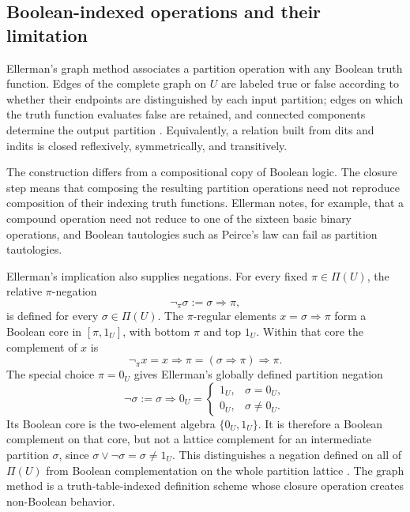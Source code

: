 \documentclass[aps,pra,reprint,nofootinbib]{revtex4-2}
\newcommand{\Part}{\Pi}
\begin{document}
\subsection{Boolean-indexed operations and their limitation}

Ellerman's graph method associates a partition operation with any Boolean
truth function.  Edges of the complete graph on $U$ are labeled true or false
according to whether their endpoints are distinguished by each input
partition; edges on which the truth function evaluates false are retained,
and connected components determine the output partition
\cite{ellerman-2019-graph-partitions}.  Equivalently, a relation built from dits and indits is
closed reflexively, symmetrically, and transitively.

The construction differs from a compositional copy of Boolean logic.  The
closure step means that composing the resulting
partition operations need not reproduce composition of their indexing truth
functions.  Ellerman notes, for example, that a compound operation need not
reduce to one of the sixteen basic binary operations, and Boolean tautologies
such as Peirce's law can fail as partition tautologies.

Ellerman's implication also supplies negations.  For every fixed
$\pi\in\Part(U)$, the relative $\pi$-negation
\begin{equation}
  \neg_{\pi}\sigma:=\sigma\Rightarrow\pi,
  \label{eq:relative-negation}
\end{equation}
is defined for every $\sigma\in\Part(U)$.  The $\pi$-regular elements
$x=\sigma\Rightarrow\pi$ form a Boolean core in $[\pi,1_U]$, with bottom
$\pi$ and top $1_U$.
Within that core the complement of $x$ is
\begin{equation}
  \neg_{\pi}x=x\Rightarrow\pi
  =(\sigma\Rightarrow\pi)\Rightarrow\pi.
  \label{eq:boolean-core-complement}
\end{equation}
The special choice $\pi=0_U$ gives Ellerman's globally defined partition
negation
\begin{equation}
  \neg\sigma:=\sigma\Rightarrow0_U=
  \begin{cases}
    1_U,&\sigma=0_U,\\
    0_U,&\sigma\ne0_U.
  \end{cases}
  \label{eq:global-partition-negation}
\end{equation}
Its Boolean core is the two-element algebra $\{0_U,1_U\}$.  It is therefore a
Boolean complement on that core, but not a lattice complement for an
intermediate partition $\sigma$, since
$\sigma\vee\neg\sigma=\sigma\ne1_U$.  This distinguishes a negation defined
on all of $\Part(U)$ from Boolean complementation on the whole partition
lattice
\cite{ellerman-2010-partition-logic,ellerman-2014-introduction}.  The graph
method is a truth-table-indexed definition scheme whose closure operation
creates non-Boolean behavior.
\end{document}
